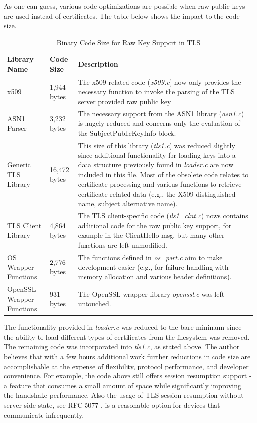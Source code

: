 \documentclass[a4paper, 10pt]{IEEEtran}
\begin{document}
As one can guess, various code optimizations are possible when raw public keys are used instead of certificates. The table below shows the impact to the code size. 

\begin{table}[htdp]
\caption{Binary Code Size for Raw Key Support in TLS}
\begin{center}
\begin{tabular}{|p{1cm}|p{}|p{}|}
\hline
\textbf{Library Name} & \textbf{Code Size} & \textbf{Description} \\
\hline\hline
x509& 1,944 bytes & The x509 related code (\textit{x509.c}) now only provides the necessary function to invoke the parsing of the TLS server provided raw public key.\\ 
\hline\hline
ASN1 Parser & 3,232 bytes & The necessary support from the ASN1 library (\textit{asn1.c}) is hugely reduced and concerns only the evaluation of the SubjectPublicKeyInfo block.\\ 
\hline\hline
Generic TLS Library & 16,472 bytes & This size of this library (\textit{tls1.c}) was reduced slightly since additional functionality for loading keys into a data structure previously found in \textit{loader.c} are now included in this file. Most of the obsolete code relates to certificate processing and various functions to retrieve certificate related data (e.g., the X509 distinguished name, subject alternative name).\\ 
\hline\hline
TLS Client Library & 4,864 bytes & The TLS client-specific code (\textit{tls1\_clnt.c}) nows contains additional code for the raw public key support, for example in the ClientHello msg, but many other functions are left unmodified. \\ 
\hline\hline
OS Wrapper Functions & 2,776 bytes & The functions defined in \textit{os\_port.c} aim to make development easier (e.g., for failure handling with memory allocation and various header definitions).\\ 
\hline\hline
OpenSSL Wrapper Functions & 931 bytes & The OpenSSL wrapper library \textit{openssl.c} was left untouched. \\ 
\hline
\end{tabular}
\end{center}
\label{tls-raw-code-table}
\end{table}

The functionality provided in \textit{loader.c} was reduced to the bare minimum since the ability to load different types of certificates from the filesystem was removed. The remaining code was incorporated into \textit{tls1.c}, as stated above. The author believes that with a few hours additional work further reductions in code size are accomplishable at the expense of flexibility, protocol performance, and developer convenience. For example, the code above still offers session resumption support - a feature that consumes a small amount of space while significantly improving the handshake performance. Also the usage of TLS session resumption without server-side state, see RFC 5077 \cite{rfc5077}, is a reasonable option for devices that communicate infrequently. 
\end{document}
